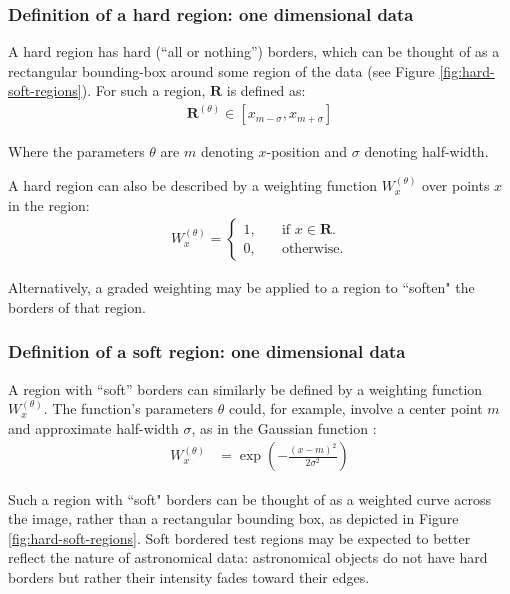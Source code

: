 \subsubsection{Definition of a hard region: one dimensional data}

A hard region has hard (``all or nothing'') borders, which can be thought of as a rectangular bounding-box around some region of the data (see Figure \ref{fig:hard-soft-regions}). For such a region, $\mathbf{R}$ is defined as:
\begin{align}
\mathbf{R}^{(\theta)} \in [x_{m-\sigma},x_{m+\sigma}] \label{eq:hard-borders}
\end{align}

Where the parameters $\theta$ are $m$ denoting $x$-position and $\sigma$ denoting half-width.

A hard region can also be described by a weighting function $W^{(\theta)}_x$ over points $x$ in the region:
\begin{align}
W^{(\theta)}_x =\begin{cases}  
1, & \quad \text{if $x \in \mathbf{R}$}.\\
0, & \quad \text{otherwise}.
\end{cases}
\label{eq:hard-borders-wgt}
\end{align}

Alternatively, a graded weighting may be applied to a region to ``soften" the borders of that region.

\subsubsection{Definition of a soft region: one dimensional data}
A region with ``soft'' borders can similarly be defined by a weighting function $W^{(\theta)}_x$. The function's parameters $\theta$ could, for example, involve a center point $m$ and approximate half-width $\sigma$, as in the Gaussian function \cite{wasserman2004all}:
\begin{align}
W^{(\theta)}_x 
&= \exp\left( -\frac{(x-m)^2}{2 \sigma^2} \right) \label{eq:region-weight-in-1d} 
\end{align}

Such a region with ``soft" borders can be thought of as a weighted curve across the image, rather than a rectangular bounding box, as depicted in Figure \ref{fig:hard-soft-regions}. Soft bordered test regions may be expected to better reflect the nature of astronomical data: astronomical objects do not have hard borders but rather their intensity fades toward their edges.

